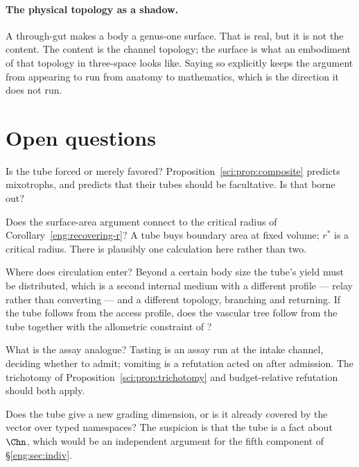 \paragraph{The physical topology as a shadow.} A through-gut makes a body a
genus-one surface. That is real, but it is not the content. The content is the
channel topology; the surface is what an embodiment of that topology in
three-space looks like. Saying so explicitly keeps the argument from appearing
to run from anatomy to mathematics, which is the direction it does not run.

\section{Open questions}
\label{tub:sec:open}

\begin{question}
Is the tube forced or merely favored? Proposition~\ref{sci:prop:composite}
predicts mixotrophs, and predicts that their tubes should be facultative. Is that
borne out?
\end{question}

\begin{question}
Does the surface-area argument connect to the critical radius of
Corollary~\ref{eng:recovering-r}? A tube buys boundary area at fixed volume;
$r^\ast$ is a critical radius. There is plausibly one calculation here rather
than two.
\end{question}

\begin{question}
Where does circulation enter? Beyond a certain body size the tube's yield must
be distributed, which is a second internal medium with a different profile ---
relay rather than converting --- and a different topology, branching and
returning. If the tube follows from the access profile, does the vascular tree
follow from the tube together with the allometric constraint of
\cite{west}?
\end{question}

\begin{question}
What is the assay analogue? Tasting is an assay run at the intake channel,
deciding whether to admit; vomiting is a refutation acted on after admission.
The trichotomy of Proposition~\ref{sci:prop:trichotomy} and budget-relative
refutation should both apply.
\end{question}

\begin{question}
Does the tube give a new grading dimension, or is it already covered by the
vector over typed namespaces? The suspicion is that the tube is a fact about
$\Chn$, which would be an independent argument for the fifth component of
\S\ref{eng:sec:indiv}.
\end{question}

